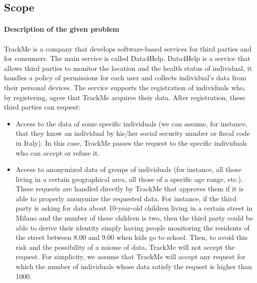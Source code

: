 \documentclass[a4paper]{article}
\begin{document}
\subsection{Scope}

\paragraph{Description of the given problem}

\paragraph{}
TrackMe is a company that develops software-based services for third parties and for consumers. The main service is called Data4Help.
 Data4Help is a service that allows third parties to monitor the location and the health status of individual, it handles a policy of permissions for each user and collects individual’s data from their personal devices.
The service supports the registration of individuals who, by registering, agree that TrackMe acquires their data. After registration, these third parties can request:

\begin{itemize}
    \item Access to the data of some specific individuals (we can assume, for instance, that they know an 
    individual by his/her social security number or fiscal code in Italy). In this case, TrackMe passes 
    the request to the specific individuals who can accept or refuse it.
    
    \item Access to anonymized data of groups of individuals (for instance, all those living in a certain 
    geographical area, all those of a specific age range, etc.). These requests are handled directly 
    by TrackMe that approves them if it is able to properly anonymize the requested data. For 
    instance, if the third party is asking for data about 10-year-old children living in a certain street 
    in Milano and the number of these children is two, then the third party could be able to derive 
    their identity simply having people monitoring the residents of the street between 8.00 and 
    9.00 when kids go to school. Then, to avoid this risk and the possibility of a misuse of data,
    TrackMe will not accept the request. For simplicity, we assume that TrackMe will accept any 
    request for which the number of individuals whose data satisfy the request is higher than 
    1000.

\end{itemize}
\end{document}
